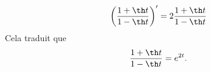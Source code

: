 \begin{displaymath}
\left( \frac{1+\th t}{1 - \th t}\right)'   = 2\frac{1+\th t}{1 - \th t}
\end{displaymath}
Cela traduit que
\[
 \frac{1+\th t}{1 - \th t} = e^{2t}.
\]
